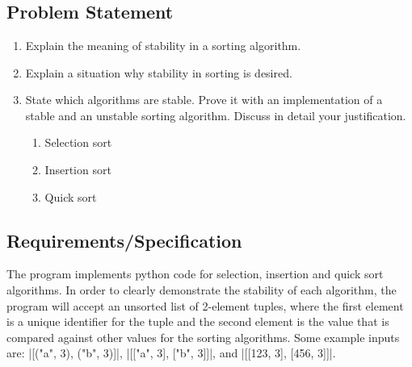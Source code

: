 \documentclass{report}
\begin{document}
\chapter{}
\section{Problem Statement}
\begin{enumerate}[label=(\alph*)]
	\item Explain the meaning of stability in a sorting algorithm.
	\item Explain a situation why stability in sorting is desired.
	\item State which algorithms are stable. Prove it with an implementation of a stable and an unstable sorting algorithm. Discuss in detail your justification.
	\begin{enumerate}[label=\roman*.]
		\item Selection sort
		\item Insertion sort
		\item Quick sort
	\end{enumerate}
\end{enumerate}
\section{Requirements/Specification}
The program implements python code for selection, insertion and quick sort algorithms. In order to clearly demonstrate the stability of each algorithm, the program will accept an unsorted list of 2-element tuples, where the first element is a unique identifier for the tuple and the second element is the value that is compared against other values for the sorting algorithms. Some example inputs are: |[("a", 3), ("b", 3)]|, |[["a", 3], ["b", 3]]|, and |[[123, 3], [456, 3]]|.
\end{document}
